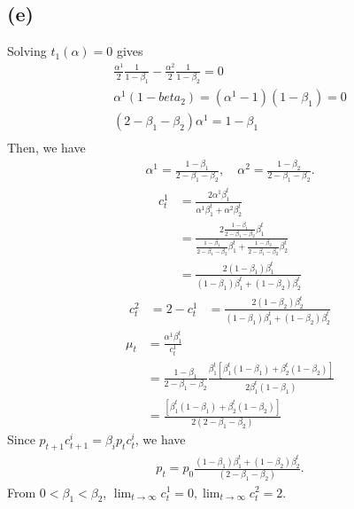 \documentclass[a4paper]{article}
\begin{document}
\subsection*{(e)}
Solving $t_1 (\alpha) = 0$ gives
\begin{gather*}
    \frac{\alpha^1}{2} \frac{1}{1-\beta_1} - \frac{\alpha^2}{2} \frac{1}{1-\beta_2} = 0\\
    \alpha^1 (1-beta_2) = (\alpha^1 - 1)(1-\beta_1) = 0\\
    (2-\beta_1 - \beta_2) \alpha^1 = 1-\beta_1\\
\end{gather*}
Then, we have
\begin{gather*}
    \alpha^1 = \frac{1-\beta_1}{2-\beta_1 - \beta_2}, \quad \alpha^2 = \frac{1-\beta_2}{2-\beta_1 - \beta_2}.
\end{gather*}
\begin{align*}
    c_t^1
    &= \frac{2 \alpha^1 \beta_1^t}{\alpha^1 \beta_1^t + \alpha^2 \beta_2^t}\\
    &= \frac{2 \frac{1-\beta_1}{2-\beta_1 - \beta_2} \beta_1^t}{\frac{1-\beta_1}{2-\beta_1 - \beta_2} \beta_1^t + \frac{1-\beta_2}{2-\beta_1 - \beta_2} \beta_2^t}\\
    &= \frac{2 (1-\beta_1) \beta_1^t}{(1-\beta_1) \beta_1^t + (1-\beta_2) \beta_2^t}
\end{align*}
\begin{gather*}
    c_t^2 
    &= 2 - c_t^1 
    &= \frac{2 (1-\beta_2) \beta_2^t}{(1-\beta_1) \beta_1^t + (1-\beta_2) \beta_2^t}
\end{gather*}
\begin{align*}
    \mu_t 
    &= \frac{\alpha^1 \beta_1^t}{c_t^1}\\
    &= \frac{1-\beta_1}{2-\beta_1-\beta_2} \frac{\beta_1^t [\beta_1^t(1-\beta_1)+ \beta_2^t (1-\beta_2)]}{2\beta_1^t (1-\beta_1)}\\
    &= \frac{[\beta_1^t(1-\beta_1)+ \beta_2^t (1-\beta_2)]}{2(2-\beta_1-\beta_2)} 
\end{align*}
Since $p_{t+1} c_{t+1}^i = \beta_i p_t c_t^i$, we have
\begin{gather*}
    p_t = p_0 \frac{(1-\beta_1)\beta_1^t + (1-\beta_2)\beta_2^t}{(2-\beta_1 - \beta_2)}.
\end{gather*}
From $0 < \beta_1 < \beta_2$, $\lim_{t \to \infty} c_t^1 =0, \lim_{t \to \infty} c_t^2 =2$.


\section{} %
\end{document}

